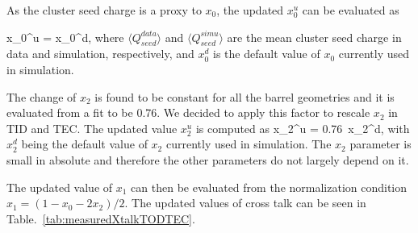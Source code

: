As the cluster seed charge is a proxy to $x_{0}$, the updated $x_{0}^{u}$ can be evaluated as

{
x_{0}^{u} = x_{0}^{d},
}
where $\langle Q_{seed}^{data} \rangle$ and $\langle Q_{seed}^{simu} \rangle$ are the mean cluster seed charge in data and simulation, respectively, and $x_{0}^{d}$ is the default value of $x_{0}$ currently used in simulation. 

The change of $x_{2}$ is found to be constant for all the barrel geometries and it is evaluated from a fit to be 0.76. We decided to apply this factor to rescale $x_{2}$ in TID and TEC. The updated value $x_{2}^{u}$ is computed as 
{
x_{2}^{u} = 0.76~x_{2}^{d},
}
with  $x_{2}^{d}$ being the default value of $x_{2}$ currently used in simulation. The $x_{2}$ parameter is small in absolute and therefore the other parameters do not largely depend on it. 

The updated value of $x_{1}$ can then be evaluated from the normalization condition $x_{1} = (1-x_{0}-2x_{2})/2$. The updated values of cross talk can be seen in Table.~\ref{tab:measuredXtalkTODTEC}.

